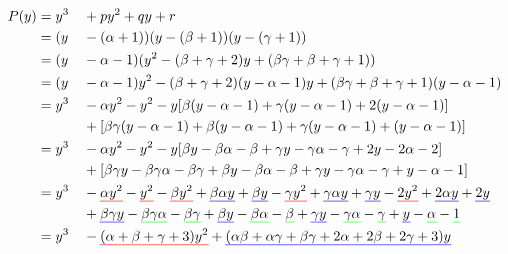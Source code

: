 \begin{solucion}
  \begin{alignat*}{2}
    P(y) &= y^3 &&+ p y^2 + qy + r \\
    &= (y&&-(\alpha+1))(y-(\beta+1))(y-(\gamma+1))\\
    &= (y&&-\alpha-1)(y^2 - (\beta+\gamma+2)y + (\beta\gamma + \beta + \gamma + 1))\\
    &= (y&&-\alpha-1)y^2 - (\beta+\gamma+2)(y-\alpha-1)y + (\beta\gamma + \beta + \gamma + 1)(y-\alpha-1)\\
    &= y^3 &&- \alpha y^2 - y^2 - y[\beta (y - \alpha - 1) + \gamma (y - \alpha - 1) + 2(y - \alpha - 1)]\\
    & &&+ [ \beta\gamma(y - \alpha - 1)  + \beta (y - \alpha - 1) + \gamma (y - \alpha - 1) + (y - \alpha - 1)]\\
    &= y^3 &&- \alpha y^2 - y^2 - y[\beta y -\beta \alpha - \beta + \gamma y - \gamma \alpha - \gamma + 2y - 2\alpha - 2] \\
    & &&+ [\beta\gamma y - \beta\gamma \alpha - \beta\gamma + \beta y - \beta \alpha - \beta + \gamma y - \gamma \alpha - \gamma + y - \alpha - 1]\\
    &= \text{\setulcolor{black}{$y^3$}}
      &&-\text{\setulcolor{red}\ul{$\alpha y^2$}}
       -\text{\setulcolor{red}\ul{$y^2$}}
       -\text{\setulcolor{red}\ul{$\beta y^2$}}
       +\text{\setulcolor{blue}\ul{$\beta\alpha y$}}
       +\text{\setulcolor{blue}\ul{$\beta y$}}
       -\text{\setulcolor{red}\ul{$\gamma y^2$}}
       +\text{\setulcolor{blue}\ul{$\gamma\alpha y$}}
       +\text{\setulcolor{blue}\ul{$\gamma y$}}
       -\text{\setulcolor{red}\ul{$2y^2$}}
       +\text{\setulcolor{blue}\ul{$2\alpha y$}}
       +\text{\setulcolor{blue}\ul{$2y$}}\\
       & &&+\text{\setulcolor{blue}\ul{$\beta\gamma y$}}
       -\text{\setulcolor{green}\ul{$\beta\gamma\alpha$}}
       -\text{\setulcolor{green}\ul{$\beta\gamma$}}
       +\text{\setulcolor{blue}\ul{$\beta y$}}
       -\text{\setulcolor{green}\ul{$\beta\alpha$}}
       -\text{\setulcolor{green}\ul{$\beta$}}
       +\text{\setulcolor{blue}\ul{$\gamma y$}}
       -\text{\setulcolor{green}\ul{$\gamma\alpha$}}
       -\text{\setulcolor{green}\ul{$\gamma$}}
       +\text{\setulcolor{blue}\ul{$y$}}
       -\text{\setulcolor{green}\ul{$\alpha$}}
       -\text{\setulcolor{green}\ul{$1$}}\\
    &= y^3&&-\text{\setulcolor{red}\ul{$(\alpha  + \beta  + \gamma + 3)y^2$}} + \text{\setulcolor{blue}\ul{$(\alpha \beta  +  \alpha\gamma  +  \beta\gamma +2\alpha +2\beta  +2\gamma + 3)y$}} \\

\end{alignat*}
\end{solucion}
